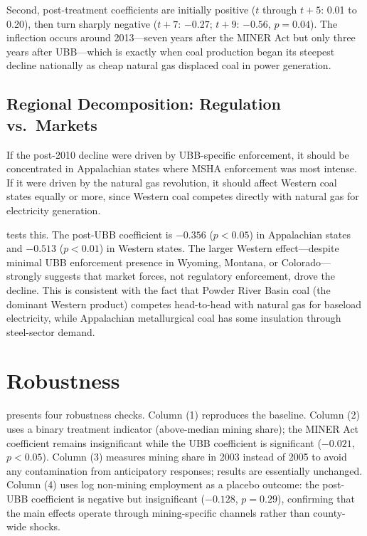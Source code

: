 \documentclass[12pt]{article}
\begin{document}
Second, post-treatment coefficients are initially positive ($t$ through $t+5$: 0.01 to 0.20), then turn sharply negative ($t+7$: $-0.27$; $t+9$: $-0.56$, $p = 0.04$). The inflection occurs around 2013---seven years after the MINER Act but only three years after UBB---which is exactly when coal production began its steepest decline nationally as cheap natural gas displaced coal in power generation.



\subsection{Regional Decomposition: Regulation vs.\ Markets}

If the post-2010 decline were driven by UBB-specific enforcement, it should be concentrated in Appalachian states where MSHA enforcement was most intense. If it were driven by the natural gas revolution, it should affect Western coal states equally or more, since Western coal competes directly with natural gas for electricity generation.

 tests this. The post-UBB coefficient is $-0.356$ ($p < 0.05$) in Appalachian states and $-0.513$ ($p < 0.01$) in Western states. The larger Western effect---despite minimal UBB enforcement presence in Wyoming, Montana, or Colorado---strongly suggests that market forces, not regulatory enforcement, drove the decline. This is consistent with the fact that Powder River Basin coal (the dominant Western product) competes head-to-head with natural gas for baseload electricity, while Appalachian metallurgical coal has some insulation through steel-sector demand.




\section{Robustness}
\label{sec:robustness}

 presents four robustness checks. Column (1) reproduces the baseline. Column (2) uses a binary treatment indicator (above-median mining share); the MINER Act coefficient remains insignificant while the UBB coefficient is significant ($-0.021$, $p < 0.05$). Column (3) measures mining share in 2003 instead of 2005 to avoid any contamination from anticipatory responses; results are essentially unchanged. Column (4) uses log non-mining employment as a placebo outcome: the post-UBB coefficient is negative but insignificant ($-0.128$, $p = 0.29$), confirming that the main effects operate through mining-specific channels rather than county-wide shocks.
\end{document}
